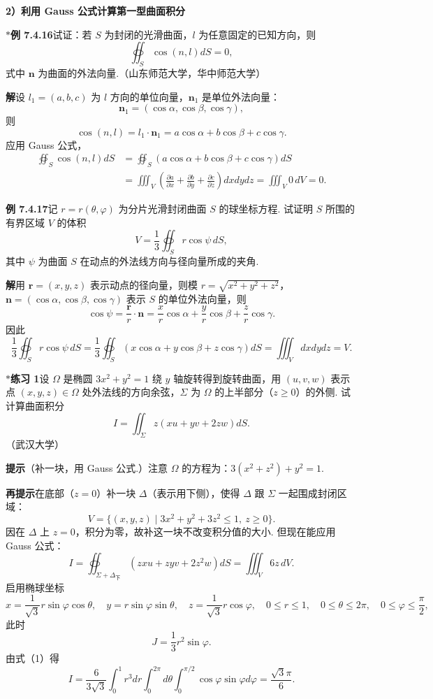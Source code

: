\documentclass[UTF8,12pt,a4paper,fontset=fandol]{ctexart}
\begin{document}
\noindent\textbf{2）利用 Gauss 公式计算第一型曲面积分}

\noindent\textbf{$*$例 7.4.16}\quad 试证：若 $S$ 为封闭的光滑曲面，$l$ 为任意固定的已知方向，则
\[
\oiint_S\cos(n,l)dS=0,
\]
式中 $\mathbf n$ 为曲面的外法向量.（山东师范大学，华中师范大学）

\noindent\textbf{解}\quad 设 $l_1=(a,b,c)$ 为 $l$ 方向的单位向量，$\mathbf n_1$ 是单位外法向量：
\[
\mathbf n_1=(\cos\alpha,\cos\beta,\cos\gamma),
\]
则
\[
\cos(n,l)=l_1\cdot\mathbf n_1=a\cos\alpha+b\cos\beta+c\cos\gamma.
\]
应用 Gauss 公式，
\[
\begin{aligned}
\oiint_S\cos(n,l)dS
&=\oiint_S(a\cos\alpha+b\cos\beta+c\cos\gamma)dS\\
&=\iiint_V\left(\frac{\partial a}{\partial x}
+\frac{\partial b}{\partial y}
+\frac{\partial c}{\partial z}\right)dxdydz
=\iiint_V0\,dV=0.
\end{aligned}
\]

\noindent\textbf{例 7.4.17}\quad 记 $r=r(\theta,\varphi)$ 为分片光滑封闭曲面 $S$ 的球坐标方程. 试证明 $S$ 所围的有界区域 $V$ 的体积
\[
V=\frac13\oiint_S r\cos\psi\,dS,
\]
其中 $\psi$ 为曲面 $S$ 在动点的外法线方向与径向量所成的夹角.

\noindent\textbf{解}\quad 用 $\mathbf r=(x,y,z)$ 表示动点的径向量，则模 $r=\sqrt{x^2+y^2+z^2}$，$\mathbf n=(\cos\alpha,\cos\beta,\cos\gamma)$ 表示 $S$ 的单位外法向量，则
\[
\cos\psi=\frac{\mathbf r}{r}\cdot\mathbf n
=\frac xr\cos\alpha+\frac yr\cos\beta+\frac zr\cos\gamma.
\]
因此
\[
\frac13\oiint_Sr\cos\psi\,dS
=\frac13\oiint_S(x\cos\alpha+y\cos\beta+z\cos\gamma)dS
=\iiint_Vdxdydz=V.
\]

\noindent\textbf{$*$练习 1}\quad 设 $\Omega$ 是椭圆 $3x^2+y^2=1$ 绕 $y$ 轴旋转得到旋转曲面，用 $(u,v,w)$ 表示点 $(x,y,z)\in\Omega$ 处外法线的方向余弦，$\Sigma$ 为 $\Omega$ 的上半部分（$z\ge0$）的外侧. 试计算曲面积分
\[
I=\iint_\Sigma z(xu+yv+2zw)dS.
\]
（武汉大学）

\noindent\textbf{提示}\quad （补一块，用 Gauss 公式.）注意 $\Omega$ 的方程为：$3(x^2+z^2)+y^2=1$.

\noindent\textbf{再提示}\quad 在底部（$z=0$）补一块 $\Delta$（表示用下侧），使得 $\Delta$ 跟 $\Sigma$ 一起围成封闭区域：
\[
V=\{(x,y,z)\mid 3x^2+y^2+3z^2\le1,\ z\ge0\}.
\]
因在 $\Delta$ 上 $z=0$，积分为零，故补这一块不改变积分值的大小. 但现在能应用 Gauss 公式：
\[
I=\oiint_{\Sigma+\Delta_{\text{下}}}(zxu+zyv+2z^2w)dS
=\iiint_V6z\,dV. \tag{1}
\]
启用椭球坐标
\[
x=\frac1{\sqrt3}r\sin\varphi\cos\theta,\quad
y=r\sin\varphi\sin\theta,\quad
z=\frac1{\sqrt3}r\cos\varphi,\quad
0\le r\le1,\quad0\le\theta\le2\pi,\quad0\le\varphi\le\frac\pi2,
\]
此时
\[
J=\frac13r^2\sin\varphi.
\]
由式（1）得
\[
I=\frac6{3\sqrt3}\int_0^1r^3dr\int_0^{2\pi}d\theta
\int_0^{\pi/2}\cos\varphi\sin\varphi d\varphi
=\frac{\sqrt3\pi}{6}.
\]
\end{document}
